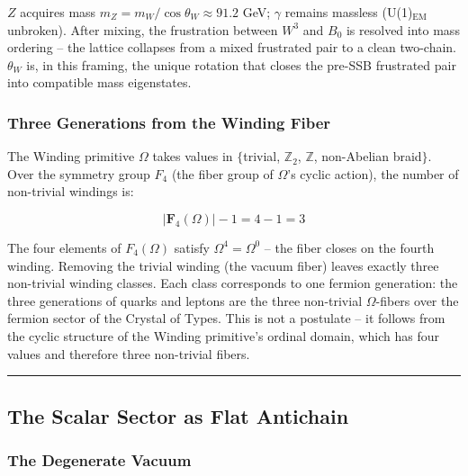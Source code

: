 \documentclass[12pt,a4paper]{article}
\begin{document}
\(Z\) acquires mass \(m_Z = m_W / \cos\theta_W \approx 91.2\) GeV;
\(\gamma\) remains massless (U(1)\(_\text{EM}\) unbroken). After mixing,
the frustration between \(W^3\) and \(B_0\) is resolved into mass
ordering -- the lattice collapses from a mixed frustrated pair to a
clean two-chain. \(\theta_W\) is, in this framing, the unique rotation
that closes the pre-SSB frustrated pair into compatible mass
eigenstates.

\hypertarget{three-generations-from-the-winding-fiber}{%
\subsubsection{Three Generations from the Winding
Fiber}\label{three-generations-from-the-winding-fiber}}

The Winding primitive \(\Omega\) takes values in \(\{\)trivial,
\(\mathbb{Z}_2\), \(\mathbb{Z}\), non-Abelian braid\(\}\). Over the
symmetry group \(F_4\) (the fiber group of \(\Omega\)'s cyclic action),
the number of non-trivial windings is:

\[|\mathbf{F}_4(\Omega)| - 1 = 4 - 1 = 3\]

The four elements of \(F_4(\Omega)\) satisfy \(\Omega^4 = \Omega^0\) --
the fiber closes on the fourth winding. Removing the trivial winding
(the vacuum fiber) leaves exactly three non-trivial winding classes.
Each class corresponds to one fermion generation: the three generations
of quarks and leptons are the three non-trivial \(\Omega\)-fibers over
the fermion sector of the Crystal of Types. This is not a postulate --
it follows from the cyclic structure of the Winding primitive's ordinal
domain, which has four values and therefore three non-trivial fibers.

\begin{center}\rule{0.5\linewidth}{0.5pt}\end{center}

\hypertarget{the-scalar-sector-as-flat-antichain}{%
\subsection{The Scalar Sector as Flat
Antichain}\label{the-scalar-sector-as-flat-antichain}}

\hypertarget{the-degenerate-vacuum}{%
\subsubsection{The Degenerate Vacuum}\label{the-degenerate-vacuum}}
\end{document}
